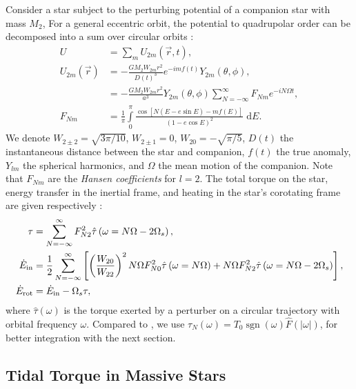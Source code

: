 \documentclass[
        fleqn,
        usenatbib,
        referee,
    ]{mnras}
\newcommand*{\abs}[1]{\left|#1\right|}
\newcommand*{\p}[1]{\left(#1\right)}
\newcommand*{\s}[1]{\left[#1\right]}
\DeclareMathOperator*{\sgn}{sgn}
\begin{document}
Consider a star subject to the perturbing potential of a companion star with
mass $M_2$, For a general eccentric orbit, the potential to quadrupolar order
can be decomposed into a sum over circular orbits \citep{sl,vlf}:
\begin{align}
    U &= \sum\limits_m U_{2m} \p{\vec{r}, t},\label{eq:u_ecc}\\
    U_{2m}\p{\vec{r}} &= -\frac{GM_2 W_{2m} r^2}{D(t)^3}
            e^{-imf(t)} Y_{2m}(\theta, \phi),\nonumber\\
        &= -\frac{GM_2W_{2m}r^2}{a^3}Y_{2m}\p{\theta, \phi}
            \sum\limits_{N = -\infty}^\infty F_{Nm}e^{-iN\Omega t},\\
    F_{Nm} &= \frac{1}{\pi}\int\limits_{0}^{\pi}
        \frac{\cos\s{N\p{E - e\sin E} - mf(E)}}
            {\p{1 - e\cos E}^2}\;\mathrm{d}E.
\end{align}
We denote $W_{2 \pm 2} = \sqrt{3\pi/10}$, $W_{2 \pm 1} = 0$, $W_{20} =
-\sqrt{\pi / 5}$, $D(t)$ the instantaneous distance between the star and
companion, $f(t)$ the true anomaly, $Y_{lm}$ the spherical harmonics, and
$\Omega$ the mean motion of the companion. Note that $F_{Nm}$ are the
\emph{Hansen coefficients} for $l = 2$. The total torque on the star, energy
transfer in the inertial frame, and heating in the star's corotating frame are
given respectively
\citep{vlf}:
\begin{align}
    \tau &= \sum\limits_{N = -\infty}^\infty F_{N2}^2
        \hat{\tau}\p{\omega =
        N\Omega - 2\Omega_s},\label{eq:tau_each}
        \\
    \dot{E}_{\rm in} &=
        \frac{1}{2}\sum\limits_{N = -\infty}^\infty\s{
            \p{\frac{W_{20}}{W_{22}}}^2 N\Omega F_{N0}^2
            \hat{\tau}\p{\omega = N\Omega}
            + N\Omega F_{N2}^2 \hat{\tau}\p{\omega =
            N\Omega - 2\Omega_s}},\label{eq:edot_in}\\
    \dot{E}_{\rm rot} &= \dot{E}_{\rm in} - \Omega_s \tau \label{eq:edot_rot},
\end{align}
where $\hat{\tau}(\omega)$ is the torque exerted by a perturber on a circular
trajectory with orbital frequency $\omega$. Compared to \citet{vlf}, we use
$\tau_N(\omega) = T_0 \sgn(\omega) \hat{F}(\abs{\omega})$, for better
integration with the next section.

\subsection{Tidal Torque in Massive Stars}
\end{document}
